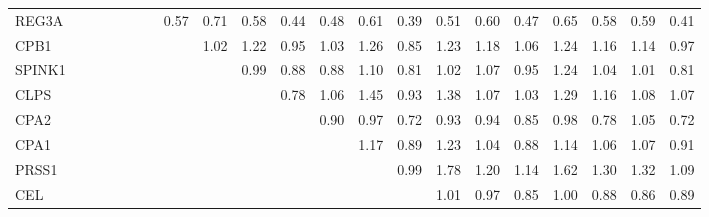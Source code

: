 \begin{longtable}{lrrrrrrrrrrrrrrrrrrrr}
REG3A    &              &              &              &             &             &             &       0.57 &         0.71 &       0.58 &       0.44 &       0.48 &        0.61 &      0.39 &        0.51 &           0.60 &          0.47 &      0.65 &        0.58 &        0.59 &       0.41 \\
CPB1     &              &              &              &             &             &             &            &         1.02 &       1.22 &       0.95 &       1.03 &        1.26 &      0.85 &        1.23 &           1.18 &          1.06 &      1.24 &        1.16 &        1.14 &       0.97 \\
SPINK1   &              &              &              &             &             &             &            &              &       0.99 &       0.88 &       0.88 &        1.10 &      0.81 &        1.02 &           1.07 &          0.95 &      1.24 &        1.04 &        1.01 &       0.81 \\
CLPS     &              &              &              &             &             &             &            &              &            &       0.78 &       1.06 &        1.45 &      0.93 &        1.38 &           1.07 &          1.03 &      1.29 &        1.16 &        1.08 &       1.07 \\
CPA2     &              &              &              &             &             &             &            &              &            &            &       0.90 &        0.97 &      0.72 &        0.93 &           0.94 &          0.85 &      0.98 &        0.78 &        1.05 &       0.72 \\
CPA1     &              &              &              &             &             &             &            &              &            &            &            &        1.17 &      0.89 &        1.23 &           1.04 &          0.88 &      1.14 &        1.06 &        1.07 &       0.91 \\
PRSS1    &              &              &              &             &             &             &            &              &            &            &            &             &      0.99 &        1.78 &           1.20 &          1.14 &      1.62 &        1.30 &        1.32 &       1.09 \\
CEL      &              &              &              &             &             &             &            &              &            &            &            &             &           &        1.01 &           0.97 &          0.85 &      1.00 &        0.88 &        0.86 &       0.89 \\

\end{longtable}
